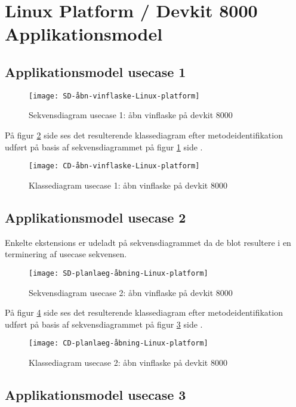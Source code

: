 \section{Linux Platform / Devkit 8000 Applikationsmodel}

\subsection{Applikationsmodel usecase 1}
\begin{figure}[H]
\caption{Sekvensdiagram usecase 1: åbn vinflaske på devkit 8000}
\label{SD:UC1-devkit}
\texttt{[image: SD-åbn-vinflaske-Linux-platform]}
\end{figure}

På figur \ref{CD:UC1-devkit} side \pageref{CD:UC1-devkit} ses det resulterende klassediagram efter metodeidentifikation udført på basis af sekvensdiagrammet på figur \ref{SD:UC1-devkit} side \pageref{SD:UC1-devkit}.
\begin{figure}[H]
	\caption{Klassediagram usecase 1: åbn vinflaske på devkit 8000}
	\label{CD:UC1-devkit}
	\texttt{[image: CD-åbn-vinflaske-Linux-platform]}
\end{figure}

\subsection{Applikationsmodel usecase 2}

Enkelte ekstensions er udeladt på sekvensdiagrammet da de blot resultere i en terminering af usecase sekvensen.

\begin{figure}[H]
	\caption{Sekvensdiagram usecase 2: åbn vinflaske på devkit 8000}
	\label{SD:UC2-devkit}
	\texttt{[image: SD-planlaeg-åbning-Linux-platform]}
\end{figure}

På figur \ref{CD:UC2-devkit} side \pageref{CD:UC2-devkit} ses det resulterende klassediagram efter metodeidentifikation udført på basis af sekvensdiagrammet på figur \ref{SD:UC2-devkit} side \pageref{SD:UC2-devkit}.
\begin{figure}[H]
	\caption{Klassediagram usecase 2: åbn vinflaske på devkit 8000}
	\label{CD:UC2-devkit}
	\texttt{[image: CD-planlaeg-åbning-Linux-platform]}
\end{figure}

\subsection{Applikationsmodel usecase 3}
